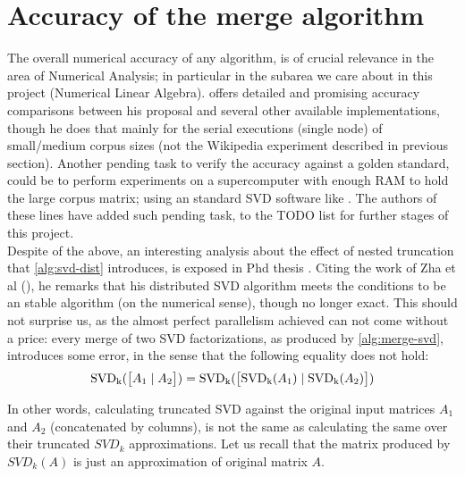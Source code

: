 \section{Accuracy of the merge algorithm}

The overall numerical accuracy of any algorithm, is of crucial
relevance in the area of Numerical Analysis; in particular in the
subarea we care about in this project (Numerical Linear
Algebra). \Rehurek offers detailed and promising accuracy comparisons
between his proposal and several other available implementations,
though he does that mainly for the serial executions (single node) of
small/medium corpus sizes (not the Wikipedia experiment described in
previous section). Another pending task to verify the accuracy against
a golden standard, could be to perform experiments on a supercomputer
with enough RAM to hold the large corpus matrix; using an standard
SVD software like \cite{svdlibc}. The authors of these lines have added
such pending task, to the TODO list for further stages of
this project. \\

Despite of the above, an interesting analysis about the effect of
nested truncation that \cref{alg:svd-dist} introduces, is exposed in
\Rehurek Phd thesis \cite{rehurek11a}. Citing the work of Zha et al
(\cite{zha00}), he remarks that his distributed SVD algorithm meets the conditions to
be an stable algorithm (on the numerical sense), though no longer
exact. This should not surprise us, as the almost perfect parallelism
achieved can not come without a price: every merge of two SVD
factorizations, as produced by \cref{alg:merge-svd}, introduces some
error, in the sense that the following equality does not hold: \\

\begin{equation}
\label{eq:merge-svd-eq}
\operatorname{SVD_k}(\begin{bmatrix}A_1 \mid A_2\end{bmatrix}) =
\operatorname{SVD_k}(\begin{bmatrix}\operatorname{SVD_k}(A_1) \mid \operatorname{SVD_k}(A_2)\end{bmatrix})
\end{equation}
\hfill

In other words, calculating truncated SVD against the original input
matrices $A_1$ and $A_2$ (concatenated by columns), is not the same as
calculating the same over their truncated $SVD_k$ approximations. Let
us recall that the matrix produced by $SVD_k(A)$ is just an approximation
of original matrix $A$. \\

